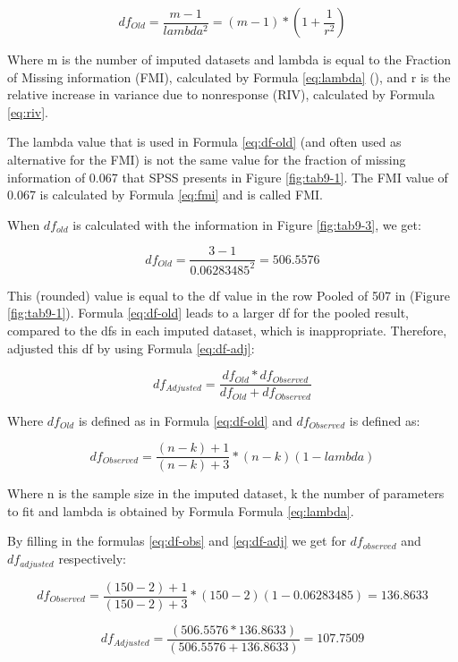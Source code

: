 \documentclass[]{book}
\begin{document}
\begin{equation}
df_{Old} = \frac{m-1}{lambda^2} = (m-1) * (1 + \frac{1}{r^2})
  \label{eq:df-old}
\end{equation}

Where m is the number of imputed datasets and lambda is equal to the
Fraction of Missing information (FMI), calculated by Formula
\eqref{eq:lambda} (\citet{raghunathan2016}), and r is the relative
increase in variance due to nonresponse (RIV), calculated by Formula
\eqref{eq:riv}.

The lambda value that is used in Formula \eqref{eq:df-old} (and often used
as alternative for the FMI) is not the same value for the fraction of
missing information of 0.067 that SPSS presents in Figure
\ref{fig:tab9-1}. The FMI value of 0.067 is calculated by Formula
\eqref{eq:fmi} and is called FMI.

When \(df_{old}\) is calculated with the information in Figure
\ref{fig:tab9-3}, we get:

\[df_{Old} = \frac{3-1}{0.06283485^2} = 506.5576\]

This (rounded) value is equal to the df value in the row Pooled of 507
in (Figure \ref{fig:tab9-1}). Formula \eqref{eq:df-old} leads to a larger
df for the pooled result, compared to the dfs in each imputed dataset,
which is inappropriate. Therefore, \citet{BARNARD1999} adjusted this df
by using Formula \eqref{eq:df-adj}:

\begin{equation}
df_{Adjusted} = \frac{df_{Old}*{df_{Observed}}}{df_{Old}+{df_{Observed}}}
  \label{eq:df-adj}
\end{equation}

Where \(df_{Old}\) is defined as in Formula \eqref{eq:df-old} and
\(df_{Observed}\) is defined as:

\begin{equation}
df_{Observed} = \frac{(n-k)+1}{(n-k)+3}*(n-k)(1-lambda)
  \label{eq:df-obs}
\end{equation}

Where n is the sample size in the imputed dataset, k the number of
parameters to fit and lambda is obtained by Formula Formula
\eqref{eq:lambda}.

By filling in the formulas \eqref{eq:df-obs} and \eqref{eq:df-adj} we get
for \(df_{observed}\) and \(df_{adjusted}\) respectively:

\[df_{Observed} = \frac{(150-2)+1}{(150-2)+3}*(150-2)(1- 0.06283485)=136.8633\]

\[df_{Adjusted} = \frac{(506.5576* 136.8633)}{(506.5576+ 136.8633)}=107.7509\]
\end{document}

